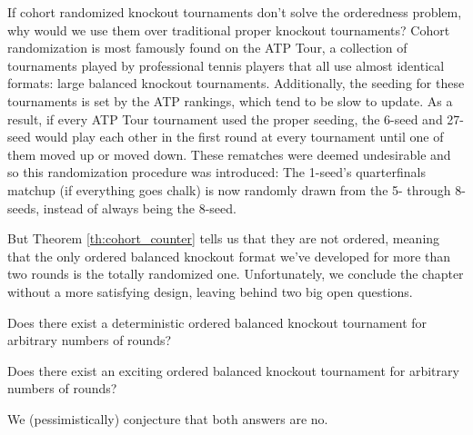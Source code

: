 {    If cohort randomized knockout tournaments don't solve the orderedness problem, why would we use them over traditional proper knockout tournaments? Cohort randomization is most famously found on the ATP Tour, a collection of tournaments played by professional tennis players that all use almost identical formats: large balanced knockout tournaments. Additionally, the seeding for these tournaments is set by the ATP rankings, which tend to be slow to update. As a result, if every ATP Tour tournament used the proper seeding, the 6-seed and 27-seed would play each other in the first round at every tournament until one of them moved up or moved down. These rematches were deemed undesirable and so this randomization procedure was introduced: The 1-seed's quarterfinals matchup (if everything goes chalk) is now randomly drawn from the 5- through 8-seeds, instead of always being the 8-seed.

    But Theorem \ref{th:cohort_counter} tells us that they are not ordered, meaning that the only ordered balanced knockout format we've developed for more than two rounds is the totally randomized one. Unfortunately, we conclude the chapter without a more satisfying design, leaving behind two big open questions.
    
    \begin{oq}{}{}
        Does there exist a deterministic ordered balanced knockout tournament for arbitrary numbers of rounds?
    \end{oq}

    \begin{oq}{}{}
        Does there exist an exciting ordered balanced knockout tournament for arbitrary numbers of rounds?
    \end{oq}

    We (pessimistically) conjecture that both answers are no.
    }
